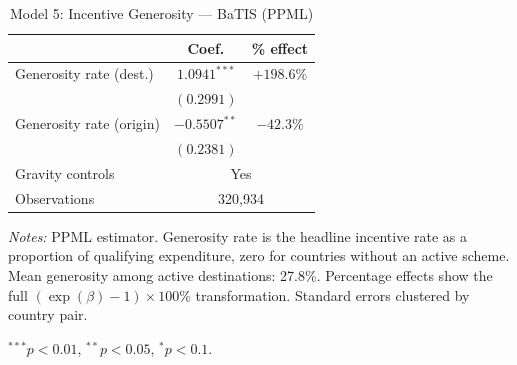\clearpage


\begin{table}[htbp]
\centering
\caption{Model 5: Incentive Generosity --- BaTIS (PPML)}
\label{tab:batis_model5}
\small
\begin{tabular}{l cc}
\toprule
 & Coef. & \% effect \\
\midrule
Generosity rate (dest.) & $1.0941^{***}$ & $+198.6\%$ \\
 & $(0.2991)$ & \\[4pt]
Generosity rate (origin) & $-0.5507^{**}$ & $-42.3\%$ \\
 & $(0.2381)$ & \\[4pt]
\midrule
Gravity controls & \multicolumn{2}{c}{Yes} \\
Observations & \multicolumn{2}{c}{320,934} \\
\bottomrule
\end{tabular}
\par\vspace{4pt}\noindent\begin{minipage}{\textwidth}
\footnotesize
\par \textit{Notes:} PPML estimator. Generosity rate is the headline incentive rate as a proportion of qualifying expenditure, zero for countries without an active scheme. Mean generosity among active destinations: 27.8\%. Percentage effects show the full $(\exp(\beta)-1) \times 100\%$ transformation. Standard errors clustered by country pair.
\par $^{***}p<0.01$, $^{**}p<0.05$, $^{*}p<0.1$.
\end{minipage}
\end{table}

\clearpage


